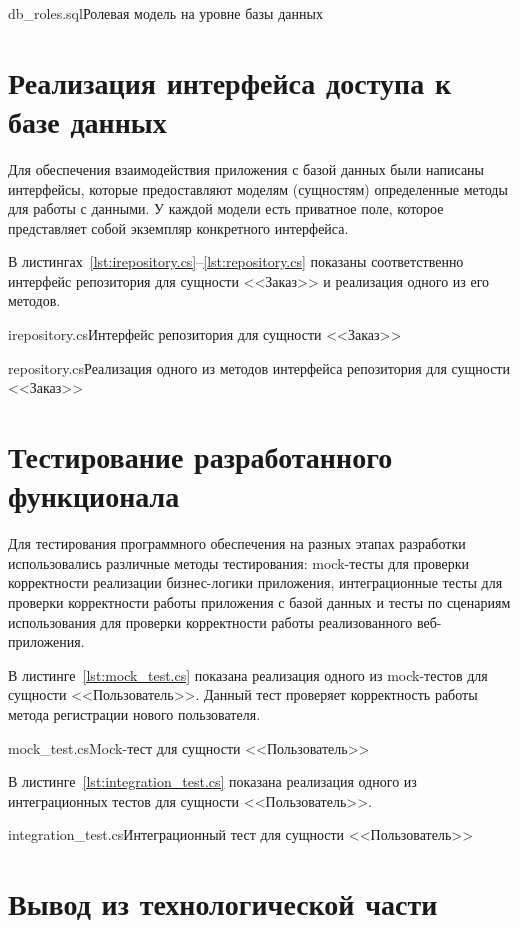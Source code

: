 \documentclass{bmstu}
\begin{document}
{db_roles.sql}{Ролевая модель на уровне базы данных}

\pagebreak
\section{Реализация интерфейса доступа к базе данных}

Для обеспечения взаимодействия приложения с базой данных были написаны интерфейсы, которые предоставляют моделям (сущностям) определенные методы для работы с данными. 
У каждой модели есть приватное поле, которое представляет собой экземпляр конкретного интерфейса.

В листингах~\ref{lst:irepository.cs}--\ref{lst:repository.cs} показаны соответственно интерфейс репозитория для сущности <<Заказ>> и реализация одного из его методов.

{irepository.cs}{Интерфейс репозитория для сущности <<Заказ>>}

{repository.cs}{Реализация одного из методов интерфейса репозитория для сущности <<Заказ>>}

\section{Тестирование разработанного функционала}

Для тестирования программного обеспечения на разных этапах разработки использовались различные методы тестирования: mock-тесты для проверки корректности реализации бизнес-логики приложения, интеграционные тесты для проверки корректности работы приложения с базой данных и тесты по сценариям использования для проверки корректности работы реализованного веб-приложения. 

В листинге~\ref{lst:mock_test.cs} показана реализация одного из mock-тестов для сущности <<Пользователь>>. 
Данный тест проверяет корректность работы метода регистрации нового пользователя.

{mock_test.cs}{Mock-тест для сущности <<Пользователь>>}

В листинге~\ref{lst:integration_test.cs} показана реализация одного из интеграционных тестов для сущности <<Пользователь>>.

{integration_test.cs}{Интеграционный тест для сущности <<Пользователь>>}

\section*{Вывод из технологической части}
\end{document}
